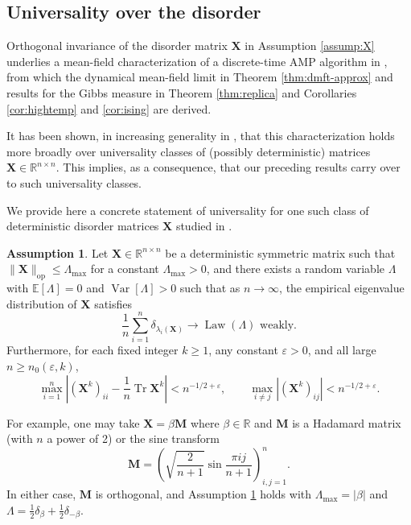 \documentclass[11pt,letterpaper,reqno]{amsart}
\def\eps{\varepsilon}
\def\E{\mathbb{E}}
\def\R{\mathbb{R}}
\def\X{\mathbf{X}}
\def\M{\mathbf{M}}
\def\Tr{\operatorname{Tr}}
\def\Law{\operatorname{Law}}
\def\Var{\operatorname{Var}}
\def\op{\mathrm{op}}
\theoremstyle{definition}
\newtheorem{assumption}[theorem]{Assumption}
\numberwithin{equation}{section}
\begin{document}
\subsection{Universality over the disorder}\label{subsec:universality}

Orthogonal invariance of the disorder matrix $\X$ in Assumption
\ref{assump:X} underlies a mean-field characterization of a discrete-time
AMP algorithm in
\cite{fan2022approximate}, from which the dynamical mean-field limit in
Theorem \ref{thm:dmft-approx} and results for the Gibbs measure in Theorem
\ref{thm:replica} and Corollaries \ref{cor:hightemp} and \ref{cor:ising}
are derived.

It has been shown, in increasing generality in
\cite{dudeja2023universality,wang2024universality,gorini2026universality}, that 
this characterization holds more broadly over universality classes of
(possibly deterministic) matrices $\X \in \R^{n \times n}$.
This implies, as a consequence, that our preceding results carry over to such
universality classes.

We provide here a concrete statement of universality for one such class of
deterministic disorder matrices $\X$ studied in
\cite{dudeja2023universality,wang2024universality}.

\begin{assumption}\label{assump:X-universal}
Let $\X \in \R^{n \times n}$ be a deterministic symmetric matrix such that
$\|\X\|_\op \leq \Lambda_{\max}$
for a constant $\Lambda_{\max}>0$, and
there exists a random variable $\Lambda$ with $\E[\Lambda]=0$ and $\Var[\Lambda]>0$
such that as $n \to \infty$, the empirical eigenvalue distribution of $\X$
satisfies
\[\frac{1}{n}\sum_{i=1}^n \delta_{\lambda_i(\X)}\to \Law(\Lambda)
\text{ weakly}.\]
Furthermore, for each fixed integer $k \geq 1$, any
constant $\eps>0$, and all large $n \geq n_0(\eps,k)$,
\[\max_{i=1}^n \left|(\X^k)_{ii}-\frac{1}{n}\Tr \X^k\right|<n^{-1/2+\eps},
\qquad \max_{i \neq j} \left|(\X^k)_{ij}\right|<n^{-1/2+\eps}.\]
\end{assumption}

For example, one may take $\X=\beta\M$ where $\beta \in \R$ and $\M$
is a Hadamard matrix (with $n$ a power of 2) or the sine transform
\[\M=\left(\sqrt{\frac{2}{n+1}}\sin\frac{\pi ij}{n+1}\right)_{i,j=1}^n.\]
In either case, $\M$ is orthogonal, and Assumption \ref{assump:X-universal}
holds with $\Lambda_{\max}=|\beta|$ and
$\Lambda=\frac{1}{2}\delta_{\beta}+\frac{1}{2}\delta_{-\beta}$.
\end{document}
